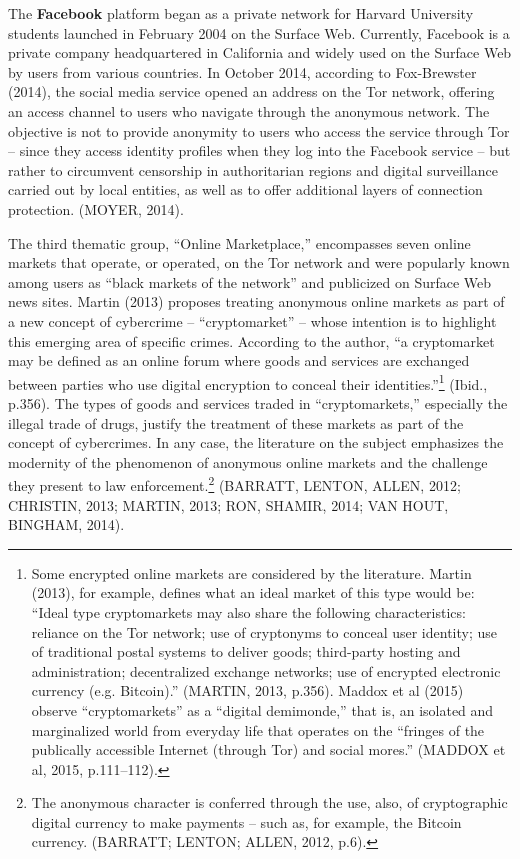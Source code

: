 The \textbf{Facebook} platform began as a private network for Harvard University students launched in February 2004 on the Surface Web. Currently, Facebook is a private company headquartered in California and widely used on the Surface Web by users from various countries. In October 2014, according to Fox-Brewster (2014), the social media service opened an address on the Tor network, offering an access channel to users who navigate through the anonymous network. The objective is not to provide anonymity to users who access the service through Tor -- since they access identity profiles when they log into the Facebook service -- but rather to circumvent censorship in authoritarian regions and digital surveillance carried out by local entities, as well as to offer additional layers of connection protection. (MOYER, 2014).

The third thematic group, ``Online Marketplace,'' encompasses seven online markets that operate, or operated, on the Tor network and were popularly known among users as ``black markets of the network'' and publicized on Surface Web news sites. Martin (2013) proposes treating anonymous online markets as part of a new concept of cybercrime -- ``cryptomarket'' -- whose intention is to highlight this emerging area of specific crimes. According to the author, ``a cryptomarket may be defined as an online forum where goods and services are exchanged between parties who use digital encryption to conceal their identities.''\footnote{Some encrypted online markets are considered by the literature. Martin (2013), for example, defines what an ideal market of this type would be: ``Ideal type cryptomarkets may also share the following characteristics: reliance on the Tor network; use of cryptonyms to conceal user identity; use of traditional postal systems to deliver goods; third-party hosting and administration; decentralized exchange networks; use of encrypted electronic currency (e.g. Bitcoin).'' (MARTIN, 2013, p.356). Maddox et al (2015) observe ``cryptomarkets'' as a ``digital demimonde,'' that is, an isolated and marginalized world from everyday life that operates on the ``fringes of the publically accessible Internet (through Tor) and social mores.'' (MADDOX et al, 2015, p.111--112).} (Ibid., p.356). The types of goods and services traded in ``cryptomarkets,'' especially the illegal trade of drugs, justify the treatment of these markets as part of the concept of cybercrimes. In any case, the literature on the subject emphasizes the modernity of the phenomenon of anonymous online markets and the challenge they present to law enforcement.\footnote{The anonymous character is conferred through the use, also, of cryptographic digital currency to make payments -- such as, for example, the Bitcoin currency. (BARRATT; LENTON; ALLEN, 2012, p.6).} (BARRATT, LENTON, ALLEN, 2012; CHRISTIN, 2013; MARTIN, 2013; RON, SHAMIR, 2014; VAN HOUT, BINGHAM, 2014).

